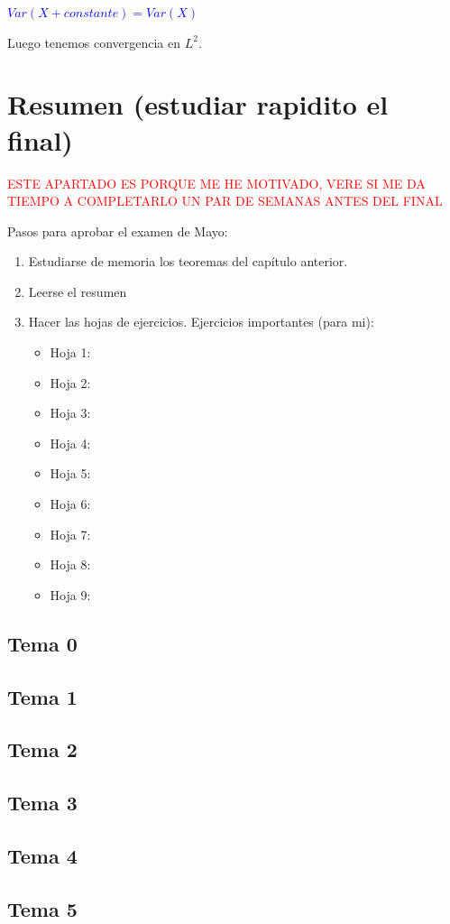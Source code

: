 \documentclass{apuntes}
\begin{document}
\textcolor{blue}{$Var(X+constante)=Var(X)$}

Luego tenemos convergencia en $L^2$.




\chapter{Resumen (estudiar rapidito el final)}
\textcolor{red}{ESTE APARTADO ES PORQUE ME HE MOTIVADO, VERE SI ME DA TIEMPO A COMPLETARLO UN PAR DE SEMANAS ANTES DEL FINAL}

Pasos para aprobar el examen de Mayo:
\begin{enumerate}
\item Estudiarse de memoria los teoremas del capítulo anterior.
\item Leerse el resumen
\item Hacer las hojas de ejercicios. Ejercicios importantes (para mi):
\begin{itemize}
\item Hoja 1:
\item Hoja 2:
\item Hoja 3:
\item Hoja 4:
\item Hoja 5:
\item Hoja 6:
\item Hoja 7:
\item Hoja 8:
\item Hoja 9:
\end{itemize}
\end{enumerate}

\section{Tema 0}
\section{Tema 1}
\section{Tema 2}
\section{Tema 3}
\section{Tema 4}
\section{Tema 5}
\end{document}
